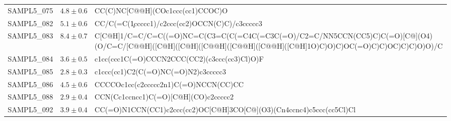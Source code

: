 \begin{tabular}{| p{2cm} | p{2cm} | p{10cm} |}
SAMPL5\_075 & $ 4.8 \pm 0.6 $ & CC(C)NC{[}C@@H{]}(COc1ccc(cc1)CCOC)O \\
SAMPL5\_082 & $ 5.1 \pm 0.6 $ & CC/C(=C(\c1ccccc1)/c2ccc(cc2)OCCN(C)C)/c3ccccc3 \\
SAMPL5\_083 & $ 8.4 \pm 0.7 $ & C{[}C@H{]}1/C=C/C=C(\C(=O)NC\2=C(C3=C(C(=C4C(=C3C(=O)/C2=C/NN5CCN(CC5)C)C(=O){[}C@{]}(O4)(O/C=C/{[}C@@H{]}({[}C@H{]}({[}C@H{]}({[}C@@H{]}({[}C@@H{]}({[}C@@H{]}({[}C@H{]}1O)C)O)C)OC(=O)C)C)OC)C)C)O)O)/C \\
SAMPL5\_084 & $ 3.6 \pm 0.5 $ & c1cc(ccc1C(=O)CCCN2CCC(CC2)(c3ccc(cc3)Cl)O)F \\
SAMPL5\_085 & $ 2.8 \pm 0.3 $ & c1ccc(cc1)C2(C(=O)NC(=O)N2)c3ccccc3 \\
SAMPL5\_086 & $ 4.5 \pm 0.6 $ & CCCCOc1cc(c2ccccc2n1)C(=O)NCCN(CC)CC \\
SAMPL5\_088 & $ 2.9 \pm 0.4 $ & CCN(Cc1ccncc1)C(=O){[}C@H{]}(CO)c2ccccc2 \\
SAMPL5\_092 & $ 3.9 \pm 0.4 $ & CC(=O)N1CCN(CC1)c2ccc(cc2)OC{[}C@H{]}3CO{[}C@{]}(O3)(Cn4ccnc4)c5ccc(cc5Cl)Cl \\
\hline
\end{tabular}
